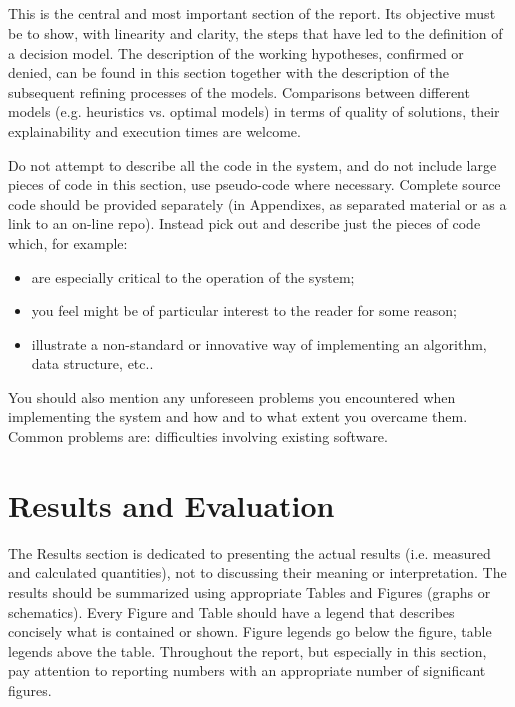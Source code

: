 \subsection{}

This is the central and most important section of the report. Its objective must be to show, with linearity and clarity, the steps that have led to the definition of a decision model. The description of the working hypotheses, confirmed or denied, can be found in this section together with the description of the subsequent refining processes of the models. Comparisons between different models (e.g. heuristics vs. optimal models) in terms of quality of solutions, their explainability and execution times are welcome. 

Do not attempt to describe all the code in the system, and do not include large pieces of code in this section, use pseudo-code where necessary. Complete source code should be provided separately (in Appendixes, as separated material or as a link to an on-line repo). Instead pick out and describe just the pieces of code which, for example:
\begin{itemize}
\item are especially critical to the operation of the system;
\item you feel might be of particular interest to the reader for some reason;
\item  illustrate a non-standard or innovative way of implementing an algorithm, data
structure, etc..
\end{itemize}

You should also mention any unforeseen problems you encountered when implementing the
system and how and to what extent you overcame them. Common problems are:
 difficulties involving existing software.


\section{Results and Evaluation}
The Results section is dedicated to presenting the actual results (i.e. measured and calculated quantities), not to discussing their meaning or interpretation. The results should be summarized using appropriate Tables and Figures (graphs or schematics). Every Figure and Table should have a legend that describes concisely what is contained or shown. Figure legends go below the figure, table legends above the table. Throughout the report, but especially in this section, pay attention to reporting numbers with an appropriate number of significant figures. 

